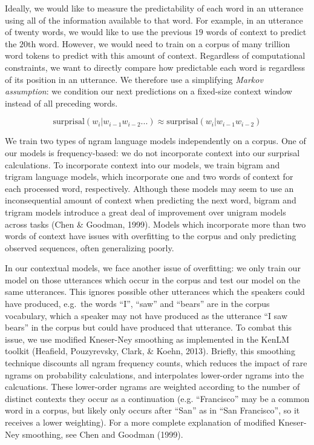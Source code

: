 \documentclass[man,floatsintext]{apa6}
\begin{document}
Ideally, we would like to measure the predictability of each word in an utterance using all of the information available to that word. For example, in an utterance of twenty words, we would like to use the previous \(19\) words of context to predict the \(20\)th word. However, we would need to train on a corpus of many trillion word tokens to predict with this amount of context. Regardless of computational constraints, we want to directly compare how predictable each word is regardless of its position in an utterance. We therefore use a simplifying \emph{Markov assumption}: we condition our next predictions on a fixed-size context window instead of all preceding words.

\[\text{surprisal}(w_i|w_{i-1}w_{i-2}...) \approx \text{surprisal}(w_i|w_{i-1}w_{i-2})\]

We train two types of ngram language models independently on a corpus. One of our models is frequency-based: we do not incorporate context into our surprisal calculations. To incorporate context into our models, we train bigram and trigram language models, which incorporate one and two words of context for each processed word, respectively. Although these models may seem to use an inconsequential amount of context when predicting the next word, bigram and trigram models introduce a great deal of improvement over unigram models across tasks (Chen \& Goodman, 1999). Models which incorporate more than two words of context have issues with overfitting to the corpus and only predicting observed sequences, often generalizing poorly.

In our contextual models, we face another issue of overfitting: we only train our model on those utterances which occur in the corpus and test our model on the same utterances. This ignores possible other utterances which the speakers could have produced, e.g.~the words \enquote{I}, \enquote{saw} and \enquote{bears} are in the corpus vocabulary, which a speaker may not have produced as the utterance \enquote{I saw bears} in the corpus but could have produced that utterance. To combat this issue, we use modified Kneser-Ney smoothing as implemented in the KenLM toolkit (Heafield, Pouzyrevsky, Clark, \& Koehn, 2013). Briefly, this smoothing technique discounts all ngram frequency counts, which reduces the impact of rare ngrams on probability calculations, and interpolates lower-order ngrams into the calcuations. These lower-order ngrams are weighted according to the number of distinct contexts they occur as a continuation (e.g. \enquote{Francisco} may be a common word in a corpus, but likely only occurs after \enquote{San} as in \enquote{San Francisco}, so it receives a lower weighting). For a more complete explanation of modified Kneser-Ney smoothing, see Chen and Goodman (1999).
\end{document}
